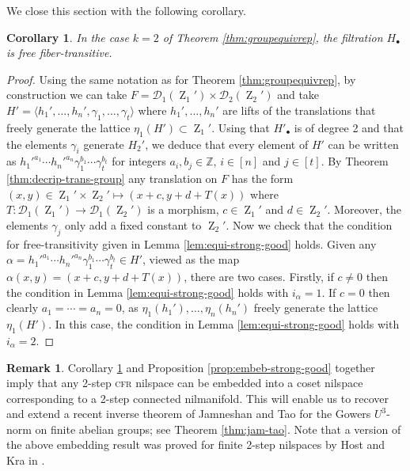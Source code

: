 \documentclass[a4paper,12pt,reqno]{amsart}
\newtheorem{corollary}[theorem]{Corollary}
\theoremstyle{definition}
\newtheorem{remark}[theorem]{Remark}
\def\to{\rightarrow}
\newcommand{\mc}{\mathcal}
\newcommand{\mb}{\mathbb}
\DeclareMathOperator{\ab}{Z}
\begin{document}
\noindent We close this section with the following corollary.

\begin{corollary}\label{cor:k=2-str-good}
In the case $k=2$ of Theorem \ref{thm:groupequivrep}, the filtration $H_\bullet$ is free fiber-transitive.
\end{corollary}

\begin{proof}
Using the same notation as for Theorem \ref{thm:groupequivrep}, by construction we can take $F=\mc{D}_1(\ab_1')\times \mc{D}_2(\ab_2')$ and take $H'=\langle h_1',\ldots,h_n',\gamma_1,\ldots,\gamma_t\rangle$ where  $h_1',\ldots,h_n'$ are lifts of the translations that freely generate the lattice $\eta_1(H')\subset \ab_1'$. Using that $H'_\bullet$ is of degree 2 and that the elements $\gamma_i$ generate $H_2'$, we deduce that every element of $H'$ can be written as ${h_1'}^{a_1}\cdots{h_n'}^{a_n}\gamma_1^{b_1}\cdots\gamma^{b_t}_t$ for integers $a_i,b_j\in \mb{Z}$, $i\in[n]$ and $j\in[t]$. By Theorem \ref{thm:decrip-trans-group} any translation on $F$ has the form $(x,y)\in \ab_1'\times \ab_2'\mapsto (x+c,y+d+T(x))$ where $T:\mc{D}_1(\ab_1')\to \mc{D}_1(\ab_2')$ is a morphism, $c\in \ab_1'$ and $d\in \ab_2'$. Moreover, the elements $\gamma_j$ only add a fixed constant to $\ab_2'$. Now we check that the condition for free-transitivity given in Lemma \ref{lem:equi-strong-good} holds. Given any $\alpha={h_1'}^{a_1}\cdots{h_n'}^{a_n}\gamma_1^{b_1}\cdots\gamma^{b_t}_t\in H'$, viewed as the map $\alpha(x,y)=(x+c,y+d+T(x))$, there are two cases. Firstly, if  $c\not=0$ then the condition in Lemma \ref{lem:equi-strong-good} holds with $i_\alpha=1$. If $c=0$ then clearly $a_1=\cdots=a_n=0$, as $\eta_1(h_1'),\ldots,\eta_n(h_n')$ freely generate the lattice $\eta_1(H')$. In this case, the condition in Lemma \ref{lem:equi-strong-good} holds with $i_\alpha=2$.
\end{proof}

\begin{remark}\label{rem:2-step-embed}
Corollary \ref{cor:k=2-str-good}  and Proposition \ref{prop:embeb-strong-good} together imply that  any 2-step \textsc{cfr} nilspace can be embedded into a coset nilspace corresponding to a 2-step connected nilmanifold. This will enable us to recover and extend a recent inverse theorem of Jamneshan and Tao \cite{J&T} for the Gowers $U^3$-norm on finite abelian groups; see Theorem \ref{thm:jam-tao}. Note that a version of the above embedding result was proved  for finite 2-step nilspaces by Host and Kra in \cite[Theorem 3]{HK-par}.
\end{remark}
\end{document}
